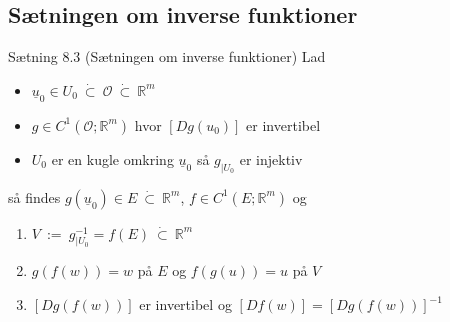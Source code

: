 \subsection{Sætningen om inverse funktioner}

\begin{boks}{Sætning 8.3 (Sætningen om inverse funktioner)}
  Lad
  \begin{itemize}[label = $\ast$]
    \item $\underline{u}_0 \in U_0 \ \dot{\subset} \ \mathcal{O} \ \dot{\subset} \ \mathbb{R}^m$
    \item $g \in C^1(\mathcal{O}; \mathbb{R}^m)$ hvor $[Dg(u_0)]$ er invertibel
    \item $U_0$ er en kugle omkring $\underline{u}_0$ så $g_{|U_0}$ er injektiv
  \end{itemize}
  så findes $g(\underline{u}_0) \in E \ \dot{\subset} \ \mathbb{R}^m$, $f \in C^1(E; \mathbb{R}^m)$ og
  \begin{enumerate}[label = (\arabic*)]
    \item $V \ := \ g^{-1}_{|U_0} = f(E) \ \dot{\subset} \ \mathbb{R}^m$
    \item $g(f(w)) = w$ på $E$ og $f(g(u)) = u$ på $V$
    \item $[Dg(f(w))]$ er invertibel og $[Df(w)] = [Dg(f(w))]^{-1}$
  \end{enumerate}
\end{boks}
